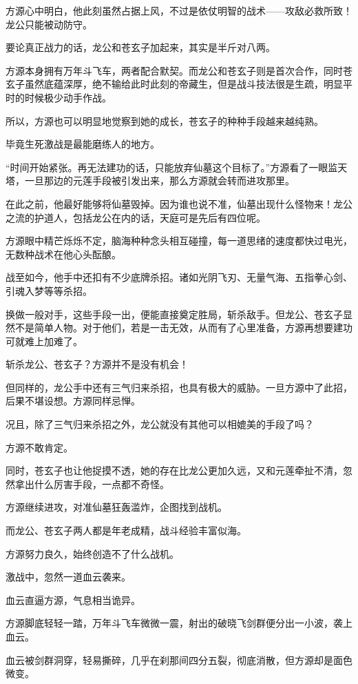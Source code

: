 \begin{this_body}
方源心中明白，他此刻虽然占据上风，不过是依仗明智的战术——攻敌必救所致！龙公只能被动防守。

要论真正战力的话，龙公和苍玄子加起来，其实是半斤对八两。

方源本身拥有万年斗飞车，两者配合默契。而龙公和苍玄子则是首次合作，同时苍玄子虽然底蕴深厚，绝不输给此时此刻的帝藏生，但是战斗技法很是生疏，明显平时的时候极少动手作战。

所以，方源也可以明显地觉察到她的成长，苍玄子的种种手段越来越纯熟。

毕竟生死激战是最能磨练人的地方。

“时间开始紧张。再无法建功的话，只能放弃仙墓这个目标了。”方源看了一眼监天塔，一旦那边的元莲手段被引发出来，那么方源就会转而进攻那里。

在此之前，他最好能够将仙墓毁掉。因为谁也说不准，仙墓出现什么怪物来！龙公之流的护道人，包括龙公在内的话，天庭可是先后有四位呢。

方源眼中精芒烁烁不定，脑海种种念头相互碰撞，每一道思绪的速度都快过电光，无数种战术在他心头酝酿。

战至如今，他手中还扣有不少底牌杀招。诸如光阴飞刃、无量气海、五指拳心剑、引魂入梦等等杀招。

换做一般对手，这些手段一出，便能直接奠定胜局，斩杀敌手。但龙公、苍玄子显然不是简单人物。对于他们，若是一击无效，从而有了心里准备，方源再想要建功可就难上加难了。

斩杀龙公、苍玄子？方源并不是没有机会！

但同样的，龙公手中还有三气归来杀招，也具有极大的威胁。一旦方源中了此招，后果不堪设想。方源同样忌惮。

况且，除了三气归来杀招之外，龙公就没有其他可以相媲美的手段了吗？

方源不敢肯定。

同时，苍玄子也让他捉摸不透，她的存在比龙公更加久远，又和元莲牵扯不清，忽然拿出什么厉害手段，一点都不奇怪。

方源继续进攻，对准仙墓狂轰滥炸，企图找到战机。

而龙公、苍玄子两人都是年老成精，战斗经验丰富似海。

方源努力良久，始终创造不了什么战机。

激战中，忽然一道血云袭来。

血云直逼方源，气息相当诡异。

方源脚底轻轻一踏，万年斗飞车微微一震，射出的破晓飞剑群便分出一小波，袭上血云。

血云被剑群洞穿，轻易撕碎，几乎在刹那间四分五裂，彻底消散，但方源却是面色微变。


\end{this_body}
